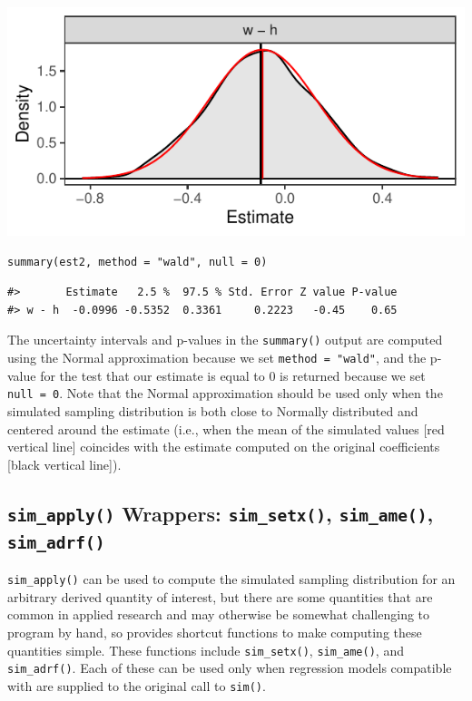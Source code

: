 \begin{center}\includegraphics{figures/unnamed-chunk-10-1} \end{center}

\begin{verbatim}
summary(est2, method = "wald", null = 0)
\end{verbatim}

\begin{verbatim}
#>       Estimate   2.5 %  97.5 % Std. Error Z value P-value
#> w - h  -0.0996 -0.5352  0.3361     0.2223   -0.45    0.65
\end{verbatim}

The uncertainty intervals and p-values in the \texttt{summary()} output are computed using the Normal approximation because we set \texttt{method\ =\ "wald"}, and the p-value for the test that our estimate is equal to 0 is returned because we set \texttt{null\ =\ 0}. Note that the Normal approximation should be used only when the simulated sampling distribution is both close to Normally distributed and centered around the estimate (i.e., when the mean of the simulated values {[}red vertical line{]} coincides with the estimate computed on the original coefficients {[}black vertical line{]}).

\hypertarget{sim_apply-wrappers-sim_setx-sim_ame-sim_adrf}{%
\subsection{\texorpdfstring{\texttt{sim\_apply()} Wrappers: \texttt{sim\_setx()}, \texttt{sim\_ame()}, \texttt{sim\_adrf()}}{sim\_apply() Wrappers: sim\_setx(), sim\_ame(), sim\_adrf()}}\label{sim_apply-wrappers-sim_setx-sim_ame-sim_adrf}}

\texttt{sim\_apply()} can be used to compute the simulated sampling distribution for an arbitrary derived quantity of interest, but there are some quantities that are common in applied research and may otherwise be somewhat challenging to program by hand, so  provides shortcut functions to make computing these quantities simple. These functions include \texttt{sim\_setx()}, \texttt{sim\_ame()}, and \texttt{sim\_adrf()}. Each of these can be used only when regression models compatible with  are supplied to the original call to \texttt{sim()}.

